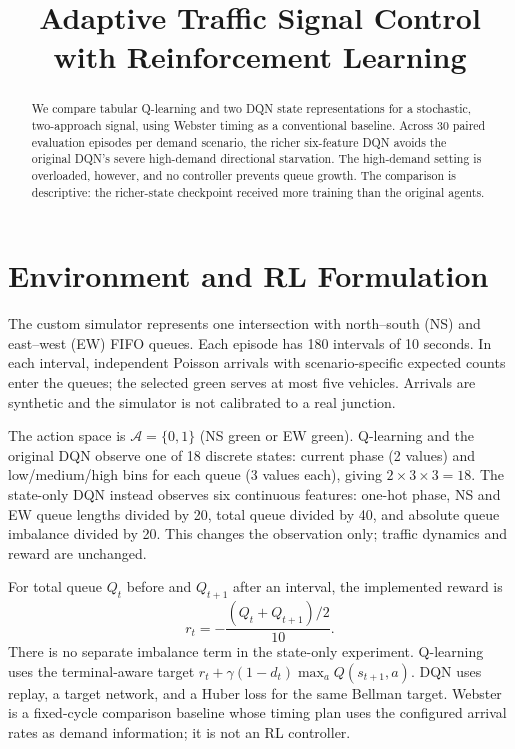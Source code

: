 \documentclass[conference]{IEEEtran}
\title{Adaptive Traffic Signal Control with Reinforcement Learning}
\author{\IEEEauthorblockN{Rahul Ahuja}
\IEEEauthorblockA{B23CH1037\\
\href{https://github.com/RahulAhuja07/Adaptive-Traffic-signals}{GitHub repository}}}
\begin{document}
\maketitle

\begin{abstract}
We compare tabular Q-learning and two DQN state representations for a stochastic, two-approach signal, using Webster timing as a conventional baseline. Across 30 paired evaluation episodes per demand scenario, the richer six-feature DQN avoids the original DQN's severe high-demand directional starvation. The high-demand setting is overloaded, however, and no controller prevents queue growth. The comparison is descriptive: the richer-state checkpoint received more training than the original agents.
\end{abstract}

\section{Environment and RL Formulation}
The custom simulator represents one intersection with north--south (NS) and east--west (EW) FIFO queues. Each episode has 180 intervals of 10 seconds. In each interval, independent Poisson arrivals with scenario-specific expected counts enter the queues; the selected green serves at most five vehicles. Arrivals are synthetic and the simulator is not calibrated to a real junction.

The action space is $\mathcal{A}=\{0,1\}$ (NS green or EW green). Q-learning and the original DQN observe one of 18 discrete states: current phase (2 values) and low/medium/high bins for each queue (3 values each), giving $2\times3\times3=18$. The state-only DQN instead observes six continuous features: one-hot phase, NS and EW queue lengths divided by 20, total queue divided by 40, and absolute queue imbalance divided by 20. This changes the observation only; traffic dynamics and reward are unchanged.

For total queue $Q_t$ before and $Q_{t+1}$ after an interval, the implemented reward is
\[
r_t=-\frac{(Q_t+Q_{t+1})/2}{10}.
\]
There is no separate imbalance term in the state-only experiment. Q-learning uses the terminal-aware target $r_t+\gamma(1-d_t)\max_a Q(s_{t+1},a)$. DQN uses replay, a target network, and a Huber loss for the same Bellman target. Webster is a fixed-cycle comparison baseline whose timing plan uses the configured arrival rates as demand information; it is not an RL controller.
\end{document}

